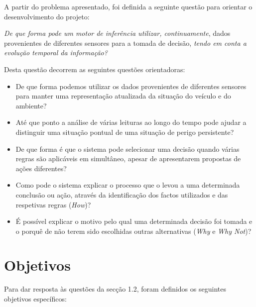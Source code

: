 A partir do problema apresentado, foi definida a seguinte questão para orientar o desenvolvimento do projeto:

\emph{De que forma pode um motor de inferência utilizar, continuamente}, dados provenientes de diferentes sensores para a tomada de decisão,\emph{ tendo em conta a evolução temporal da informação?}

Desta questão decorrem as seguintes questões orientadoras:

\begin{itemize}
  \item De que forma podemos utilizar os dados provenientes de diferentes sensores para manter uma representação atualizada da situação do veículo e do ambiente?
  \item Até que ponto a análise de várias leituras ao longo do tempo pode ajudar a distinguir uma situação pontual de uma situação de perigo persistente?
  \item De que forma é que o sistema pode selecionar uma decisão quando várias regras são aplicáveis em simultâneo, apesar de apresentarem propostas de ações diferentes?
  \item Como pode o sistema explicar o processo que o levou a uma determinada conclusão ou ação, através da identificação dos factos utilizados e das respetivas regras (\emph{How})?
  \item É possível explicar o motivo pelo qual uma determinada decisão foi tomada e o porquê de não terem sido escolhidas outras alternativas (\emph{Why }e \emph{Why Not})?
\end{itemize}

\section{Objetivos}\label{sec:1.3}

Para dar resposta às questões da secção 1.2, foram definidos os seguintes objetivos específicos:


